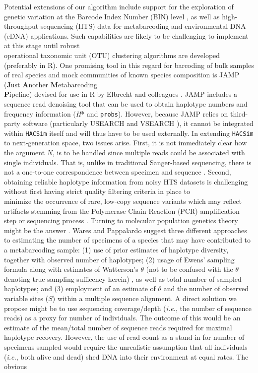 Potential extensions of our algorithm include support for the exploration of genetic variation at the Barcode Index Number (BIN) level \cite{ratnasingham2013dna}, as well as high-throughput sequencing (HTS) data for metabarcoding and environmental DNA (eDNA) applications. Such capabilities are likely to be challenging to implement at this stage until robust \\ operational taxonomic unit (OTU) clustering algorithms are developed (preferably in R). One promising tool in this regard for barcoding of bulk samples of real species and mock communities of known species composition is JAMP (\textbf{J}ust \textbf{A}nother \textbf{M}etabarcoding \\ \textbf{P}ipeline) devised for use in R by Elbrecht and colleagues \cite{elbrecht2018estimating}. JAMP includes a sequence read denoising tool that can be used to obtain haplotype numbers and frequency information (\textit{H}* and {\tt probs}). However, because JAMP relies on third-party software (particularly USEARCH \cite{edgar2010search} and VSEARCH \cite{rognes2016versatile}), it cannot be integrated within {\tt HACSim} itself and will thus have to be used externally. In extending {\tt HACSim} to next-generation space, two issues arise. First, it is not immediately clear how the argument $N$, is to be handled since multiple reads could be associated with single individuals. That is, unlike in traditional Sanger-based sequencing, there is not a one-to-one correspondence between specimen and sequence \cite{adams2019beyond, wares2015can}. Second, obtaining reliable haplotype information from noisy HTS datasets is challenging without first having strict quality filtering criteria in place to \\ minimize the occurrence of rare, low-copy sequence variants which may reflect artifacts stemming from the Polymerase Chain Reaction (PCR) amplification step or sequencing process \cite{braukmann2019metabarcoding, elbrecht2018estimating, turon2019metaphylogeography}. Turning to molecular population genetics theory might be the answer \cite{adams2019beyond}. Wares and Pappalardo \cite{wares2015can} suggest three different approaches to estimating the number of specimens of a species that may have contributed to a metabarcoding sample: (1) use of prior estimates of haplotype diversity, together with observed number of haplotypes; (2) usage of Ewens' sampling formula \cite{ewens1972sampling} along with estimates of Watterson's $\theta$ (not to be confused with the $\theta$ denoting true sampling sufficency herein) \cite{watterson1975segregating}, as well as total number of sampled haplotypes; and (3) employment of an estimate of $\theta$ and the number of observed variable sites ($S$) within a multiple sequence alignment. A direct solution we propose might be to use sequencing coverage/depth (\textit{i.e.}, the number of sequence reads) as a proxy for number of individuals. The outcome of this would be an estimate of the mean/total number of sequence reads required for maximal haplotype recovery. However, the use of read count as a stand-in for number of specimens sampled would require the unrealistic assumption that all individuals (\textit{i.e.}, both alive and dead) shed DNA into their environment at equal rates. The obvious 